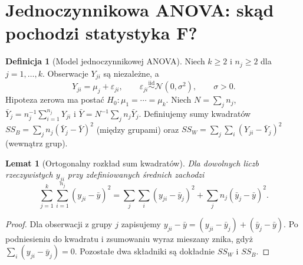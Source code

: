 \documentclass[11pt,a4paper,oneside]{report}
\numberwithin{equation}{chapter}
\theoremstyle{plain}
\newtheorem{lemat}[twierdzenie]{Lemat}
\theoremstyle{definition}
\newtheorem{definicja}{Definicja}[chapter]
\theoremstyle{remark}
\newcommand{\Normal}{\mathcal N}
\newcommand{\iid}{\mathrel{\overset{\mathrm{iid}}\sim}}
\begin{document}
\section{Jednoczynnikowa ANOVA: skąd pochodzi statystyka F?}
\label{sec:anova-introduction}
\begin{definicja}[Model jednoczynnikowej ANOVA]
Niech $k\ge2$ i $n_j\ge2$ dla $j=1,\ldots,k$.
Obserwacje $Y_{ji}$ są niezależne, a
\[
 Y_{ji}=\mu_j+\varepsilon_{ji},\qquad
 \varepsilon_{ji}\iid\Normal(0,\sigma^2),\qquad\sigma>0.
\]
Hipoteza zerowa ma postać
$H_0:\mu_1=\cdots=\mu_k$.
Niech $N=\sum_jn_j$,
$\bar Y_j=n_j^{-1}\sum_{i=1}^{n_j}Y_{ji}$ i
$\bar Y=N^{-1}\sum_jn_j\bar Y_j$.
Definiujemy sumy kwadratów
$SS_B=\sum_jn_j(\bar Y_j-\bar Y)^2$ (między grupami)
oraz $SS_W=\sum_j\sum_i(Y_{ji}-\bar Y_j)^2$
(wewnątrz grup).
\end{definicja}

\begin{lemat}[Ortogonalny rozkład sum kwadratów]
\label{lem:anova-decomp}
Dla dowolnych liczb rzeczywistych $y_{ji}$ przy
zdefiniowanych średnich zachodzi
\[
 \sum_{j=1}^k\sum_{i=1}^{n_j}(y_{ji}-\bar y)^2
 =\sum_j\sum_i(y_{ji}-\bar y_j)^2
 +\sum_jn_j(\bar y_j-\bar y)^2.
\]
\end{lemat}
\begin{proof}
Dla obserwacji z grupy $j$ zapisujemy
$y_{ji}-\bar y=(y_{ji}-\bar y_j)+(\bar y_j-\bar y)$.
Po podniesieniu do kwadratu i zsumowaniu wyraz mieszany
znika, gdyż $\sum_i(y_{ji}-\bar y_j)=0$.
Pozostałe dwa składniki są dokładnie $SS_W$ i $SS_B$.
\end{proof}
\end{document}
